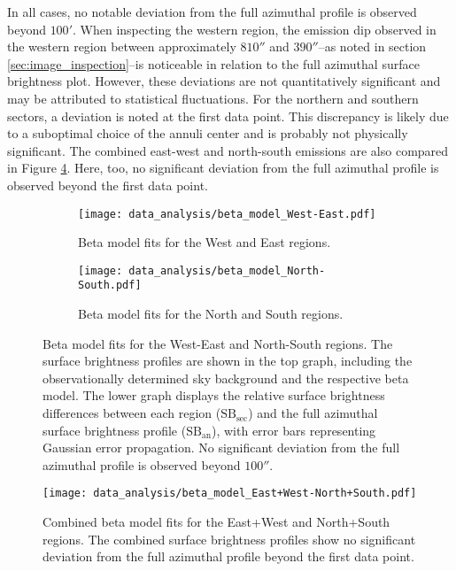 In all cases, no notable deviation from the full azimuthal profile is observed beyond \(100'\). When inspecting the western region, the emission dip observed in the western region between approximately \(810''\) and \(390''\)--as noted in section \ref{sec:image_inspection}--is noticeable in relation to the full azimuthal surface brightness plot. However, these deviations are not quantitatively significant and may be attributed to statistical fluctuations. For the northern and southern sectors, a deviation is noted at the first data point. This discrepancy is likely due to a suboptimal choice of the annuli center and is probably not physically significant. The combined east-west and north-south emissions are also compared in Figure \ref{fig:beta_model_East_West_North_South}. Here, too, no significant deviation from the full azimuthal profile is observed beyond the first data point.
\begin{figure}[htbp]
    \centering
    \begin{subfigure}{\textwidth}
        \centering
        \texttt{[image: data\_analysis/beta\_model\_West-East.pdf]}
        \caption{Beta model fits for the West and East regions.}
        \label{fig:beta_model_West_East}
    \end{subfigure}
    \vspace{0.5cm} 
    \begin{subfigure}{\textwidth}
        \centering
        \texttt{[image: data\_analysis/beta\_model\_North-South.pdf]}
        \caption{Beta model fits for the North and South regions.}
        \label{fig:beta_model_North_South}
    \end{subfigure}
    \caption{Beta model fits for the West-East and North-South regions. The surface brightness profiles are shown in the top graph, including the observationally determined sky background and the respective beta model. The lower graph displays the relative surface brightness differences between each region (\(\text{SB}_{\text{sec}}\)) and the full azimuthal surface brightness profile (\(\text{SB}_{\text{an}}\)), with error bars representing Gaussian error propagation. No significant deviation from the full azimuthal profile is observed beyond \(100''\).}
    \label{fig:beta_models_West_North}
\end{figure}
%
\begin{figure}[htbp]
    \centering
    \texttt{[image: data\_analysis/beta\_model\_East+West-North+South.pdf]}
    \caption{Combined beta model fits for the East+West and North+South regions. The combined surface brightness profiles show no significant deviation from the full azimuthal profile beyond the first data point.}
    \label{fig:beta_model_East_West_North_South}
\end{figure}
